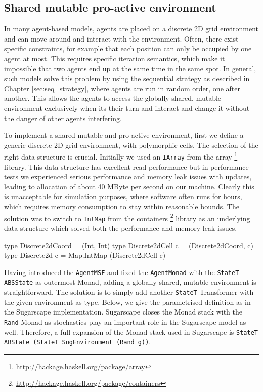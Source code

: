 \subsection{Shared mutable pro-active environment}
In many agent-based models, agents are placed on a discrete 2D grid environment and can move around and interact with the environment. Often, there exist specific constraints, for example that each position can only be occupied by one agent at most. This requires specific iteration semantics, which make it impossible that two agents end up at the same time in the same spot. In general, such models solve this problem by using the sequential strategy as described in Chapter \ref{sec:seq_strategy}, where agents are run in random order, one after another. This allows the agents to access the globally shared, mutable environment exclusively when its their turn and interact and change it without the danger of other agents interfering.

To implement a shared mutable and pro-active environment, first we define a generic discrete 2D grid environment, with polymorphic cells. The selection of the right data structure is crucial. Initially we used an \texttt{IArray} from the array \footnote{\url{http://hackage.haskell.org/package/array}} library. This data structure has excellent read performance but in performance tests we experienced serious performance and memory leak issues with updates, leading to allocation of about 40 MByte per second on our machine. Clearly this is unacceptable for simulation purposes, where software often runs for hours, which requires memory consumption to stay within reasonable bounds. The solution was to switch to \texttt{IntMap} from the containers \footnote{\url{http://hackage.haskell.org/package/containers}} library as an underlying data structure which solved both the performance and memory leak issues.

\begin{HaskellCode}
type Discrete2dCoord  = (Int, Int)
type Discrete2dCell c = (Discrete2dCoord, c)
type Discrete2d c     = Map.IntMap (Discrete2dCell c)
\end{HaskellCode}

Having introduced the \texttt{AgentMSF} and fixed the \texttt{AgentMonad} with the \texttt{StateT ABSState} as outermost Monad, adding a globally shared, mutable environment is straightforward. The solution is to simply add another \texttt{StateT} Transformer with the given environment as type. Below, we give the parametrised definition as in the Sugarscape implementation. Sugarscape closes the Monad stack with the \texttt{Rand} Monad as stochastics play an important role in the Sugarscape model as well. Therefore, a full expansion of the Monad stack used in Sugarscape is \texttt{StateT ABState (StateT SugEnvironment (Rand g))}.

